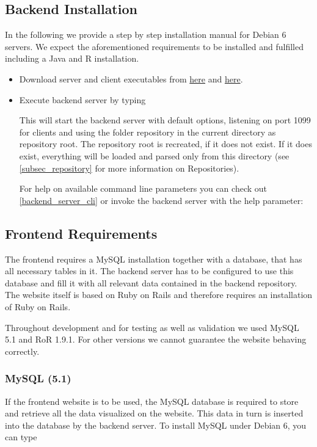 		 \subsection{Backend Installation}\label{install_backend}
		 In the following we provide a step by step installation manual for Debian 6 servers. We expect the aforementioned requirements to be installed and fulfilled including a Java and R installation.
		 	\begin{itemize}
				\item Download server and client executables from \href{\urlserver}{here} and \href{\urlclient}{here}.
				\item Execute backend server by typing
				
				
				This will start the backend server with default options, listening on port 1099 for clients and using the folder repository in the current directory as repository root. The repository root is recreated, if it does not exist. If it does exist, everything will be loaded and parsed only from this directory (see \ref{subsec_repository} for more information on Repositories).
				
				For help on available command line parameters you can check out \ref{backend_server_cli} or invoke the backend server with the help parameter:
				
		 	\end{itemize}
		 \subsection{Frontend Requirements}\label{frontend_requirements}
		 The frontend requires a MySQL installation together with a database, that has all necessary tables in it. The backend server has to be configured to use this database and fill it with all relevant data contained in the backend repository. The website itself is based on Ruby on Rails and therefore requires an installation of Ruby on Rails. 
		 
		 Throughout development and for testing as well as validation we used MySQL 5.1 and RoR 1.9.1. For other versions we cannot guarantee the website behaving correctly.
		 
		 \subsubsection{MySQL (5.1)}
		 If the \clusteval frontend website is to be used, the MySQL database is required to store and retrieve all the data visualized on the website. This data in turn is inserted into the database by the backend server. To install MySQL under Debian 6, you can type
		
